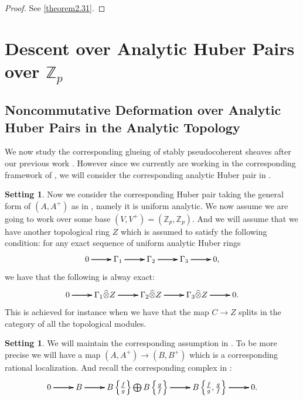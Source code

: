 \documentclass[12pt]{amsart}
\theoremstyle{definition}
\numberwithin{equation}{section}
\newtheorem{setting}[theorem]{Setting}
\begin{document}
\begin{proof}
See \cref{theorem2.31}.
\end{proof}









\newpage


\section{Descent over Analytic Huber Pairs over $\mathbb{Z}_p$}

\subsection{Noncommutative Deformation over Analytic Huber Pairs in the Analytic Topology}



\noindent We now study the corresponding glueing of stably pseudocoherent sheaves after our previous work \cite{T3}. However since we currently are working in the corresponding framework of \cite{Ked2}, we will consider the corresponding analytic Huber pair in \cite{Ked2}. 



\begin{setting}
Now we consider the corresponding Huber pair taking the general form of $(A,A^+)$ as in \cite[Definition 1.1.2]{Ked2}, namely it is uniform analytic. We now assume we are going to work over some base $(V,V^+)=(\mathbb{Z}_p,\mathbb{Z}_p)$. And we will assume that we have another topological ring $Z$ which is assumed to satisfy the following condition: for any exact sequence of uniform analytic Huber rings
\[
\xymatrix@C+0pc@R+0pc{
0 \ar[r] \ar[r] \ar[r] &\Gamma_1 \ar[r] \ar[r] \ar[r] &\Gamma_2 \ar[r] \ar[r] \ar[r] &\Gamma_3 \ar[r] \ar[r] \ar[r] &0,
}
\] 
we have that the following is alway exact:
\[
\xymatrix@C+0pc@R+0pc{
0 \ar[r] \ar[r] \ar[r] &\Gamma_1\widehat{\otimes} Z \ar[r] \ar[r] \ar[r] &\Gamma_2\widehat{\otimes} Z \ar[r] \ar[r] \ar[r] &\Gamma_3\widehat{\otimes} Z \ar[r] \ar[r] \ar[r] &0.
}
\] 
This is achieved for instance when we have that the map $C\rightarrow Z$ splits in the category of all the topological modules.
\end{setting}


\begin{setting}
We will maintain the corresponding assumption in \cite[Hypothesis 1.7.1]{Ked2}. To be more precise we will have a map $(A,A^+)\rightarrow (B,B^+)$ which is a corresponding rational localization. And recall the corresponding complex in \cite{Ked2}:
\[
\xymatrix@C+0pc@R+0pc{
0 \ar[r] \ar[r] \ar[r] &B \ar[r] \ar[r] \ar[r] &B\left\{\frac{f}{g}\right\}\bigoplus B\left\{\frac{g}{f}\right\} \ar[r] \ar[r] \ar[r] &B\left\{\frac{f}{g},\frac{g}{f}\right\} \ar[r] \ar[r] \ar[r] &0.
}
\]	
\end{setting}
\end{document}
